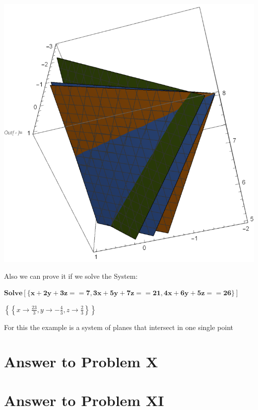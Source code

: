 \documentclass[11pt,a4paper]{article}
\begin{document}
\includegraphics{img/h3_gr1.eps}

Also we can prove it if we solve the System:

\begin{doublespace}
\noindent\(\pmb{\text{Solve}[\{x+2 y+3 z==7,3 x+5 y+7 z==21,4 x+6 y+5 z==26\}]}\)
\end{doublespace}

\begin{doublespace}
\noindent\(\left\{\left\{x\to \frac{23}{3},y\to -\frac{4}{3},z\to \frac{2}{3}\right\}\right\}\)
\end{doublespace}

For this the example is a system of planes that intersect in one single point


\clearpage
\section{Answer to Problem X}\label{sec:P10}



\clearpage
\section{Answer to Problem XI}\label{sec:P11}
\end{document}
